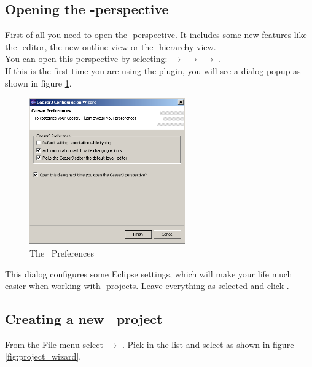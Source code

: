 \subsection{Opening the \caesarj -perspective}
First of all you need to open the \caesarj -perspective. It includes some new features like the \caesar -editor, the new outline view or the \caesarj -hierarchy view.\\
You can open this perspective by selecting:  $\rightarrow$  $\rightarrow$  $\rightarrow$ .\\
If this is the first time you are using the plugin, you will see a dialog popup as shown in figure \ref{fig:view_properties}.

\begin{figure}[htbp]
	\centering
		\includegraphics[width=0.60\textwidth]{images/view_properties.png}
	\caption{The \caesarj ~Preferences}	
	\label{fig:view_properties}
\end{figure}

This dialog configures some Eclipse settings, which will make your life much easier when
working with \caesarj -projects. Leave everything as selected and click
.

\subsection{Creating a new \caesarj ~project \label{creating_project}}
From the File menu select  $\rightarrow$ . Pick  in the list and select  as shown in figure \ref{fig:project_wizard}.

